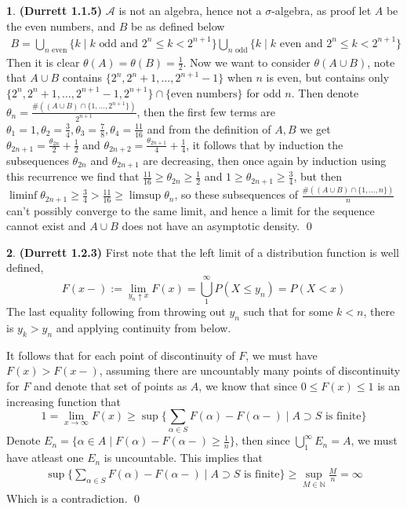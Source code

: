 \documentclass[10.5pt]{article}
\theoremstyle{definition}
\newtheorem{pb}{}
\newcommand{\set}[1]{\{#1\}}
\begin{document}
    \begin{pb}\textbf{(Durrett 1.1.5)}
        \(\mathcal{A}\) is not an algebra, hence not a \(\sigma\)-algebra, as proof let \(A\) be the even numbers, and \(B\) be as defined below
        \begin{align*}
            B = \bigcup_{n \text{ even}} \set{k \mid k \text{ odd and } 2^n \leq k < 2^{n+1}} \bigcup_{n \text{ odd}}\set{k \mid k \text{ even and }2^n \leq k < 2^{n+1}}
        \end{align*}
        Then it is clear \(\theta(A) = \theta(B) = \frac12\). Now we want to consider \(\theta(A \cup B)\), note that \(A \cup B\) contains \(\set{2^n, 2^n+1,\hdots,2^{n+1}-1}\) when \(n\) is even, but contains only \(\set{2^n, 2^n+1,\hdots,2^{n+1}-1,2^{n+1}} \cap \set{\text{even numbers}}\) for odd \(n\). Then denote \(\theta_n = \frac{\#((A \cup B) \cap \set{1,\hdots,2^{n+1}})}{2^{n+1}}\), then the first few terms are \(\theta_1 = 1, \theta_2 = \frac{3}{4}, \theta_3 = \frac{7}{8}, \theta_4 = \frac{11}{16}\) and from the definition of \(A,B\) we get \(\theta_{2n+1} = \frac{\theta_{2n}}{2} + \frac12\) and \(\theta_{2n+2} = \frac{\theta_{2n+1}}{4} + \frac{1}{4}\), it follows that by induction the subsequences \(\theta_{2n}\) and \(\theta_{2n+1}\) are decreasing, then once again by induction using this recurrence we find that \(\frac{11}{16} \geq \theta_{2n} \geq \frac12\) and \(1 \geq \theta_{2n+1} \geq \frac34\), but then \(\liminf \theta_{2n+1} \geq \frac34 > \frac{11}{16} \geq \limsup \theta_n\), so these subsequences of \(\frac{\#((A \cup B) \cap \set{1,\hdots,n})}{n}\) can't possibly converge to the same limit, and hence a limit for the sequence cannot exist and \(A \cup B\) does not have an asymptotic density. \qed
    \end{pb}
    \begin{pb}\textbf{(Durrett 1.2.3)} First note that the left limit of a distribution function is well defined,
        \[F(x-) := \lim_{y_n\uparrow x}F(x) = \bigcup_1^\infty P(X \leq y_n) = P(X < x)\]
        The last equality following from throwing out \(y_n\) such that for some \(k<n\), there is \(y_k > y_n\) and applying continuity from below.
        
        It follows that for each point of discontinuity of \(F\), we must have \(F(x) > F(x-)\), assuming there are uncountably many points of discontinuity for \(F\) and denote that set of points as \(A\), we know that since \(0 \leq F(x) \leq 1\) is an increasing function that \[1=\lim_{x\to\infty}F(x) \geq \sup\set{\sum_{\alpha \in S}F(\alpha) - F(\alpha-) \mid A \supset S \text{ is finite}}\]
        Denote \(E_n = \set{\alpha \in A \mid F(\alpha) - F(\alpha-) \geq \frac{1}{n}}\), then since \(\bigcup_1^\infty E_n = A\), we must have atleast one \(E_n\) is uncountable. This implies that 
        \begin{align*}
            \sup\set{\sum_{\alpha \in S}F(\alpha) - F(\alpha-) \mid A \supset S \text{ is finite}} \geq \sup_{M \in \mathbb{N}}\frac{M}{n}= \infty
        \end{align*}
        Which is a contradiction. \qed
    \end{pb}
\end{document}
